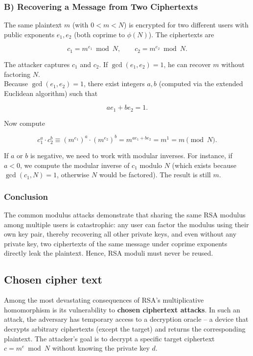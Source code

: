 \subsubsection*{B) Recovering a Message from Two Ciphertexts }

The same plaintext \(m\) (with \(0 < m < N\)) is encrypted for two different users with public exponents \(e_1, e_2\) (both coprime to \(\phi(N)\)). The ciphertexts are  

\[
c_1 = m^{e_1} \bmod N, \qquad c_2 = m^{e_2} \bmod N.
\]

The attacker captures \(c_1\) and \(c_2\). If \(\gcd(e_1, e_2) = 1\), he can recover \(m\) without factoring \(N\).\\
Because \(\gcd(e_1, e_2) = 1\), there exist integers \(a, b\) (computed via the extended Euclidean algorithm) such that  

\[
a e_1 + b e_2 = 1.
\]

Now compute  

\[
c_1^a \cdot c_2^b \equiv (m^{e_1})^a \cdot (m^{e_2})^b = m^{a e_1 + b e_2} = m^1 = m \pmod{N}.
\]

If \(a\) or \(b\) is negative, we need to work with modular inverses. For instance, if \(a < 0\), we compute the modular inverse of \(c_1\) modulo \(N\) (which exists because \(\gcd(c_1, N) = 1\), otherwise \(N\) would be factored). The result is still \(m\).
\vspace{2em}
\subsubsection*{Conclusion}

The common modulus attacks demonstrate that sharing the same RSA modulus among multiple users is catastrophic: any user can factor the modulus using their own key pair, thereby recovering all other private keys, and even without any private key, two ciphertexts of the same message under coprime exponents directly leak the plaintext. Hence, RSA moduli must never be reused.

\subsection{Chosen cipher text}

Among the most devastating consequences of RSA's multiplicative homomorphism is its vulnerability to \textbf{chosen ciphertext attacks}. In such an attack, the adversary has temporary access to a decryption oracle – a device that decrypts arbitrary ciphertexts (except the target) and returns the corresponding plaintext. The attacker's goal is to decrypt a specific target ciphertext \(c = m^e \bmod N\) without knowing the private key \(d\).

